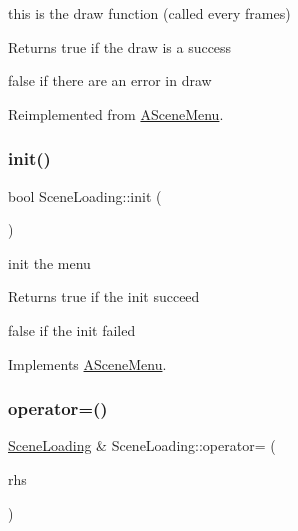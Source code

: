 this is the draw function (called every frames) 

\begin{DoxyReturn}{Returns}
true if the draw is a success 

false if there are an error in draw 
\end{DoxyReturn}


Reimplemented from \hyperlink{class_a_scene_menu_a5c11f34c83f025e1181219bf25ce4694}{A\+Scene\+Menu}.

\mbox{\label{class_scene_loading_aa0463a9826f1b50e5980e41d57c80778}} 
\subsubsection{\texorpdfstring{init()}{init()}}
{\footnotesize\ttfamily bool Scene\+Loading\+::init (\begin{DoxyParamCaption}{ }\end{DoxyParamCaption})\hspace{0.3cm}{\ttfamily [virtual]}}



init the menu 

\begin{DoxyReturn}{Returns}
true if the init succeed 

false if the init failed 
\end{DoxyReturn}


Implements \hyperlink{class_a_scene_menu_a78bdee98bd7df224524586a060f9bdec}{A\+Scene\+Menu}.

\mbox{\label{class_scene_loading_a9b3dbaab5a584f4a90e25a381ddd800f}} 
\subsubsection{\texorpdfstring{operator=()}{operator=()}}
{\footnotesize\ttfamily \hyperlink{class_scene_loading}{Scene\+Loading} \& Scene\+Loading\+::operator= (\begin{DoxyParamCaption}\item[{\hyperlink{class_scene_loading}{Scene\+Loading} const \&}]{rhs }\end{DoxyParamCaption})}



